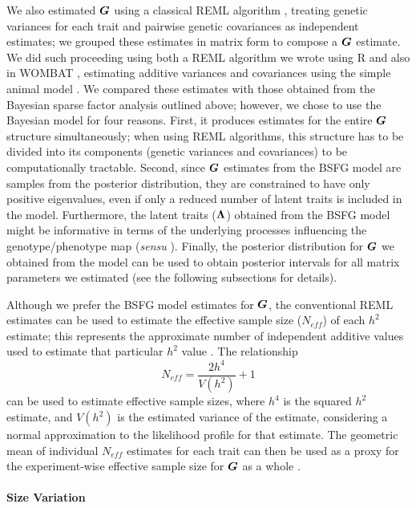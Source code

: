 \documentclass [twocolumn, natbib, nospthms, 10pt] {svjour3}
\begin{document}
We also estimated $\boldsymbol{G}$ using a classical REML algorithm
\citep{shaw_maximum-likelihood_1987}, treating genetic variances for
each trait and pairwise genetic covariances as independent estimates;
we grouped these estimates in matrix form to compose a $\boldsymbol{G}$
estimate. We did such proceeding using both a REML algorithm we wrote
using R \citep{r_core_team_r:_2013} and also in WOMBAT \citep
{meyer_wombat--tool_2007}, estimating additive variances and
covariances using the simple animal model \citep
{lynch_genetics_1998}. We compared these estimates with those obtained
from the Bayesian sparse factor analysis outlined above; however, we
chose to use the Bayesian model for four reasons. First, it produces
estimates for the entire $\boldsymbol{G}$ structure simultaneously; when using
REML algorithms, this structure has to be divided into its components
(genetic variances and covariances) to be computationally
tractable. Second, since $\boldsymbol{G}$ estimates from the BSFG model are
samples from the posterior distribution, they are constrained to have
only positive eigenvalues, even if only a reduced number of latent
traits is included in the model. Furthermore, the latent traits
($\boldsymbol{\Lambda}$) obtained from the BSFG model might be informative in
terms of the underlying processes influencing the genotype/phenotype
map (\emph {sensu} \citealp {wagner_perspective:_1996}). Finally, the
posterior distribution for $\boldsymbol{G}$ we obtained from the model can be
used to obtain posterior intervals for all matrix parameters we
estimated (see the following subsections for details).

Although we prefer the BSFG model estimates for $\boldsymbol{G}$, the
conventional REML estimates can be used to estimate the effective
sample size ($N_{eff}$) of each $h^2$ estimate; this represents the
approximate number of independent additive values used to estimate
that particular $h^2$ value \citep{cheverud_morphological_1995}. The
relationship
\begin{equation}
  N_{eff} = \frac{2h^4}{V(h^2)} + 1
\end{equation}
can be used to estimate effective sample sizes, where $h^4$ is the
squared $h^2$ estimate, and $V(h^2)$ is the estimated variance of the
estimate, considering a normal approximation to the likelihood profile
for that estimate. The geometric mean of individual $N_{eff}$
estimates for each trait can then be used as a proxy for the
experiment-wise effective sample size for $\boldsymbol{G}$ as a whole
\citep{cheverud_morphological_1995}.

\paragraph{Size Variation}
\end{document}

